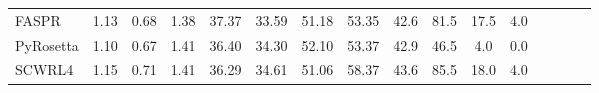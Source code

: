 \begin{table}
{\begin{tabular}{@{}lccccccccccccccc@{}}
                \textnormal{\hspace{0.5cm}FASPR} & 1.13 & 0.68 & 1.38 & 37.37 & 33.59 & 51.18 & 53.35 & 42.6 & 81.5 & 17.5 & 4.0 \\
                \textnormal{\hspace{0.5cm}PyRosetta} & 1.10 & 0.67 & 1.41 & 36.40 & 34.30 & 52.10 & 53.37 & 42.9 & 46.5 & 4.0 & 0.0 \\
                \textnormal{\hspace{0.5cm}SCWRL4} & 1.15 & 0.71 & 1.41 & 36.29 & 34.61 & 51.06 & 58.37 & 43.6 & 85.5 & 18.0 & 4.0 \\
            \bottomrule
        \end{tabular}
    }
    \label{tab:casp14_data_table}
\end{table}